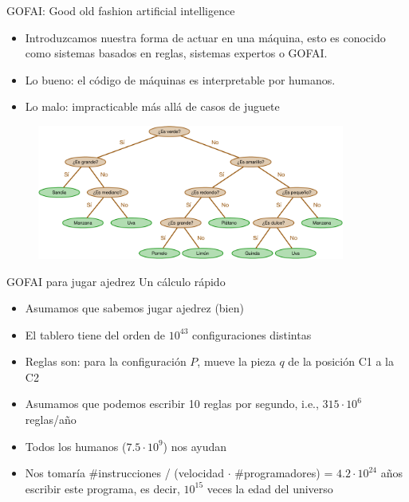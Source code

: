 \documentclass[9pt]{beamer}
\begin{document}
\begin{frame}{GOFAI: Good old fashion artificial intelligence}
  \begin{itemize}
    \item Introduzcamos nuestra forma de actuar en una máquina, esto es conocido como sistemas basados en reglas, sistemas expertos o GOFAI.
    \item Lo bueno: el código de máquinas es interpretable por humanos. 
    \item Lo malo: impracticable más allá de casos de juguete
  \end{itemize}
  \begin{figure}
    \centering
    \includegraphics[width=0.9\textwidth]{../../img/cap0_arbol}
  \end{figure}
\end{frame}

\begin{frame}{GOFAI para jugar ajedrez}
Un cálculo rápido
  \begin{itemize}
    \item Asumamos que sabemos jugar ajedrez (bien)
    \item El tablero tiene del orden de $10^{43}$ configuraciones distintas
    \item Reglas son: para la configuración $P$, mueve la pieza $q$ de la posición C1 a la C2
    \item Asumamos que podemos escribir 10 reglas por segundo, i.e., $315\cdot 10^{6}$ reglas/año
    \item Todos los humanos ($7.5\cdot10^9$) nos ayudan
    \item Nos tomaría \#instrucciones / (velocidad $\cdot$ \#programadores) = $4.2\cdot 10^{24}$ años escribir este programa, es decir, $10^{15}$ veces la edad del universo
  \end{itemize}

  \begin{figure}
    \centering
  \end{figure}
\end{frame}
\end{document}
